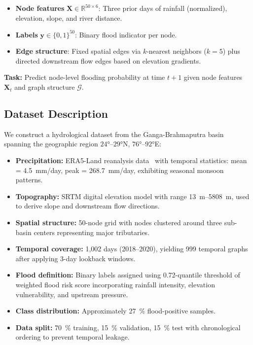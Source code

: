 \documentclass[conference]{IEEEtran}
\begin{document}
\begin{itemize}
\item \textbf{Node features} $\mathbf{X} \in \mathbb{R}^{50 \times 6}$: Three prior days of rainfall (normalized), elevation, slope, and river distance.
\item \textbf{Labels} $\mathbf{y} \in \{0,1\}^{50}$: Binary flood indicator per node.
\item \textbf{Edge structure}: Fixed spatial edges via $k$-nearest neighbors ($k=5$) plus directed downstream flow edges based on elevation gradients.
\end{itemize}

\noindent\textbf{Task:} Predict node-level flooding probability at time $t+1$ given node features $\mathbf{X}_t$ and graph structure $\mathcal{G}$.

\subsection{Dataset Description}

We construct a hydrological dataset from the Ganga-Brahmaputra basin spanning the geographic region $24°$--$29°$N, $76°$--$92°$E:

\begin{itemize}
\item \textbf{Precipitation:} ERA5-Land reanalysis data~\cite{b14} with temporal statistics: mean = \SI{4.5}{mm/day}, peak = \SI{268.7}{mm/day}, exhibiting seasonal monsoon patterns.
\item \textbf{Topography:} SRTM digital elevation model with range \SI{13}{m}--\SI{5808}{m}, used to derive slope and downstream flow directions.
\item \textbf{Spatial structure:} 50-node grid with nodes clustered around three sub-basin centers representing major tributaries.
\item \textbf{Temporal coverage:} 1,002 days (2018--2020), yielding 999 temporal graphs after applying 3-day lookback windows.
\item \textbf{Flood definition:} Binary labels assigned using 0.72-quantile threshold of weighted flood risk score incorporating rainfall intensity, elevation vulnerability, and upstream pressure.
\item \textbf{Class distribution:} Approximately \SI{27}{\percent} flood-positive samples.
\item \textbf{Data split:} \SI{70}{\percent} training, \SI{15}{\percent} validation, \SI{15}{\percent} test with chronological ordering to prevent temporal leakage.
\end{itemize}
\end{document}
